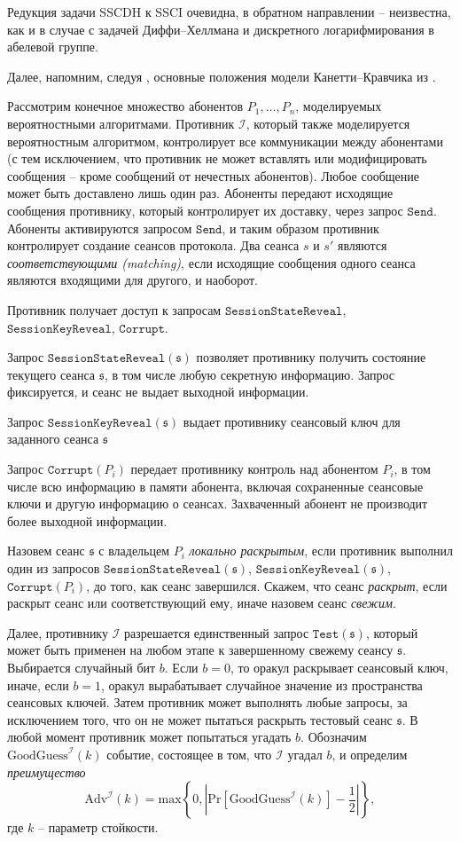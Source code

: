 \documentclass[a4paper,12pt]{article}
\theoremstyle{definition}
\begin{document}
Редукция задачи SSCDH к SSCI очевидна, в обратном направлении -- неизвестна, как и в случае с задачей Диффи--Хеллмана и дискретного логарифмирования в абелевой группе.

Далее, напомним, следуя \cite{DF}, основные положения модели Канетти--Кравчика из \cite{CK}.

Рассмотрим конечное множество абонентов $P_1,\dots,P_n$, моделируемых вероятностными алгоритмами. Противник $\mathcal{I}$, который также моделируется вероятностным алгоритмом,
контролирует все коммуникации между абонентами (с тем исключением, что противник не может вставлять или модифицировать сообщения -- кроме сообщений от нечестных абонентов).
Любое сообщение может быть доставлено лишь один раз. Абоненты передают исходящие сообщения противнику, который контролирует их доставку, через запрос $\mathtt{Send}$. Абоненты
активируются запросом $\mathtt{Send}$, и таким образом противник контролирует создание сеансов протокола. Два сеанса $s$ и $s'$ являются \emph{соответствующими (matching)}, если
исходящие сообщения одного сеанса являются входящими для другого, и наоборот.

Противник получает доступ к запросам $\mathtt{SessionStateReveal}$, $\mathtt{SessionKeyReveal}$, $\mathtt{Corrupt}$. 

Запрос $\mathtt{SessionStateReveal}(\mathfrak{s})$ позволяет противнику получить состояние текущего сеанса $\mathfrak{s}$, в том числе любую секретную информацию. Запрос фиксируется, и сеанс 
не выдает выходной информации.

Запрос  $\mathtt{SessionKeyReveal}(\mathfrak{s})$ выдает противнику сеансовый ключ для заданного сеанса $\mathfrak{s}$

Запрос $\mathtt{Corrupt}(P_i)$ передает противнику контроль над абонентом $P_i$, в том числе всю информацию в памяти абонента, включая сохраненные сеансовые ключи и другую информацию о сеансах. Захваченный абонент не производит более выходной информации.

Назовем сеанс $\mathfrak{s}$  с владельцем $P_i$ \emph{локально раскрытым}, если противник выполнил один из запросов $\mathtt{SessionStateReveal}(\mathfrak{s})$, $\mathtt{SessionKeyReveal}(\mathfrak{s})$, $\mathtt{Corrupt}(P_i)$, до того, как сеанс завершился. Скажем, что сеанс \emph{раскрыт}, если раскрыт сеанс или соответствующий ему, иначе назовем сеанс \emph{свежим}.

Далее, противнику $\mathcal{I}$ разрешается единственный запрос $\mathtt{Test}(\mathfrak{s})$, который может быть применен на любом этапе к завершенному свежему сеансу $\mathfrak{s}$.
Выбирается случайный бит $b$. Если $b=0$, то оракул раскрывает сеансовый ключ, иначе, если $b=1$, оракул вырабатывает случайное значение из пространства сеансовых ключей. Затем противник может выполнять любые запросы, за исключением того, что он не может пытаться раскрыть тестовый сеанс $\mathfrak{s}$. В любой момент противник может попытаться угадать $b$. Обозначим
$\mathrm{GoodGuess}^{\mathcal{I}}(k)$ событие, состоящее в том, что $\mathcal{I}$ угадал $b$, и определим \emph{преимущество}
$$
\mathrm{Adv}^{\mathcal{I}}(k)=\mathrm{max}\left\{0,\left|\mathrm{Pr}[\mathrm{GoodGuess}^{\mathcal{I}}(k)]-\frac{1}{2}\right|\right\},
$$
где $k$ -- параметр стойкости.
\end{document}
